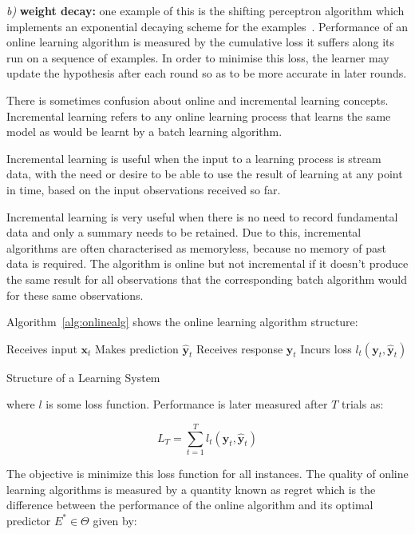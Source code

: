 \textit{b)} \textbf{weight decay:} one example of this is the shifting
perceptron algorithm which implements an exponential decaying scheme for the
examples~\cite{cavallantietal2007}.  Performance of an online learning algorithm
is measured by the cumulative loss it suffers along its run on a sequence of
examples. In order to minimise this loss, the learner may update the hypothesis
after each round so as to be more accurate in later rounds.


There is sometimes confusion about online and incremental learning concepts.
Incremental learning refers to any online learning process that learns the same
model as would be learnt by a batch learning algorithm. 

Incremental learning is useful when the input to a learning process is stream
data, with the need or desire to be able to use the result of learning at any
point in time, based on the input observations received so far. 

Incremental learning is very useful when there is no need to record fundamental
data and only a summary needs to be retained. Due to this, incremental
algorithms are often characterised as memoryless, because no memory of past data
is required.  The algorithm is online but not incremental if it doesn't produce
the same result for all observations that the corresponding batch algorithm
would for these same observations.



Algorithm~\ref{alg:onlinealg} shows the online learning algorithm structure:

\begin{algorithm}[ht]
\begin{algorithmic}[1]
    \STATE Receives input $\mathbf{x}_t$
    \STATE Makes prediction $\mathbf{\hat{y}}_t$
    \STATE Receives response $\mathbf{y}_t$
    \STATE Incurs loss $l_t(\mathbf{y}_t,\mathbf{\hat{y}}_t)$
\end{algorithmic}
\caption{Structure of a Learning System}
\label{alg:onlinealg}
\end{algorithm}

\noindent where $l$ is some loss function. Performance is later measured after
$T$ trials as:

\begin{equation*}
L_T = \sum_{t=1}^T l_t(\mathbf{y}_t,\mathbf{\hat{y}}_t)
\end{equation*}

The objective is minimize this loss function for all instances.
The quality of online learning algorithms is measured by a quantity known as
regret which is the difference between the performance of the online algorithm
and its optimal predictor $E^* \in \Theta$ given by:

